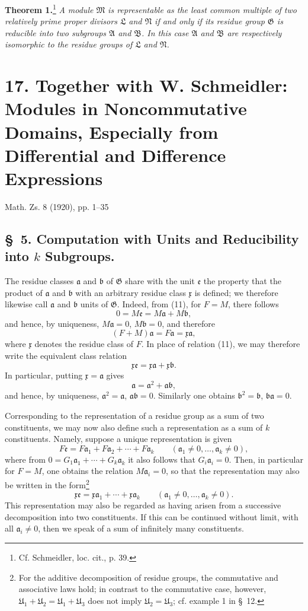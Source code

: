 \documentclass[11pt]{article}
\newcommand{\mM}{\mathfrak{M}}
\newcommand{\mN}{\mathfrak{N}}
\newcommand{\mL}{\mathfrak{L}}
\newcommand{\mG}{\mathfrak{G}}
\newcommand{\mA}{\mathfrak{A}}
\newcommand{\mB}{\mathfrak{B}}
\newcommand{\ma}{\mathfrak{a}}
\newcommand{\mb}{\mathfrak{b}}
\newcommand{\mx}{\mathfrak{x}}
\newcommand{\me}{\mathfrak{e}}
\providecommand{\mU}{\mathfrak{U}}
\begin{document}
\textbf{Theorem 1.}\footnote{Cf. Schmeidler, loc. cit., p. 39.} \emph{A module $\mM$ is representable as the least common multiple of two relatively prime proper divisors $\mL$ and $\mN$ if and only if its residue group $\mG$ is reducible into two subgroups $\mA$ and $\mB$. In this case $\mA$ and $\mB$ are respectively isomorphic to the residue groups of $\mL$ and $\mN$.}

\clearpage
\setcounter{footnote}{0}
\section*{17. Together with W. Schmeidler: Modules in Noncommutative Domains, Especially from Differential and Difference Expressions}
\begin{center}
Math. Zs. 8 (1920), pp. 1--35
\end{center}

\subsection*{\S~5. Computation with Units and Reducibility into $k$ Subgroups.}

The residue classes $\ma$ and $\mb$ of $\mG$ share with the unit $\me$ the property that the product of $\ma$ and $\mb$ with an arbitrary residue class $\mx$ is defined; we therefore likewise call $\ma$ and $\mb$ units of $\mG$. Indeed, from (11), for $F=M$, there follows
\[
 0=M\me=M\ma+M\mb,
\]
and hence, by uniqueness, $M\ma=0$, $M\mb=0$, and therefore
\[
 (F+M)\ma=F\ma=\mx\ma,
\]
where $\mx$ denotes the residue class of $F$. In place of relation (11), we may therefore write the equivalent class relation
\[
 \mx\me=\mx\ma+\mx\mb.
\]
In particular, putting $\mx=\ma$ gives
\[
 \ma=\ma^2+\ma\mb,
\]
and hence, by uniqueness, $\ma^2=\ma$, $\ma\mb=0$. Similarly one obtains $\mb^2=\mb$, $\mb\ma=0$.

Corresponding to the representation of a residue group as a sum of two constituents, we may now also define such a representation as a sum of $k$ constituents. Namely, suppose a unique representation is given
\[
 F\me=F\ma_1+F\ma_2+\cdots+F\ma_k\qquad(\ma_1\ne0,\ldots,\ma_k\ne0),
\]
where from $0=G_1\ma_1+\cdots+G_k\ma_k$ it also follows that $G_i\ma_i=0$. Then, in particular for $F=M$, one obtains the relation $M\ma_i=0$, so that the representation may also be written in the form\footnote{For the additive decomposition of residue groups, the commutative and associative laws hold; in contrast to the commutative case, however, $\mU_1+\mU_2=\mU_1+\mU_3$ does not imply $\mU_2=\mU_3$; cf. example 1 in \S~12.}
\begin{equation}
 \mx\me=\mx\ma_1+\cdots+\mx\ma_k\qquad(\ma_1\ne0,\ldots,\ma_k\ne0).
\tag{12}
\end{equation}
This representation may also be regarded as having arisen from a successive decomposition into two constituents. If this can be continued without limit, with all $\ma_i\ne0$, then we speak of a sum of infinitely many constituents.
\end{document}
